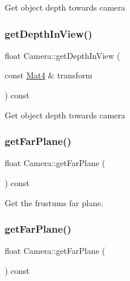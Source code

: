 Get object depth towards camera \mbox{\label{classCamera_a5b38e0d536fb4773aaad12285634b227}} 
\subsubsection{\texorpdfstring{get\+Depth\+In\+View()}{getDepthInView()}\hspace{0.1cm}{\footnotesize\ttfamily [2/2]}}
{\footnotesize\ttfamily float Camera\+::get\+Depth\+In\+View (\begin{DoxyParamCaption}\item[{const \hyperlink{classMat4}{Mat4} \&}]{transform }\end{DoxyParamCaption}) const}

Get object depth towards camera \mbox{\label{classCamera_ae3582b9b0a37d8d3351f6a1fc5a9b45c}} 
\subsubsection{\texorpdfstring{get\+Far\+Plane()}{getFarPlane()}\hspace{0.1cm}{\footnotesize\ttfamily [1/2]}}
{\footnotesize\ttfamily float Camera\+::get\+Far\+Plane (\begin{DoxyParamCaption}{ }\end{DoxyParamCaption}) const\hspace{0.3cm}{\ttfamily [inline]}}

Get the frustum\textquotesingle{}s far plane. \mbox{\label{classCamera_ae3582b9b0a37d8d3351f6a1fc5a9b45c}} 
\subsubsection{\texorpdfstring{get\+Far\+Plane()}{getFarPlane()}\hspace{0.1cm}{\footnotesize\ttfamily [2/2]}}
{\footnotesize\ttfamily float Camera\+::get\+Far\+Plane (\begin{DoxyParamCaption}{ }\end{DoxyParamCaption}) const\hspace{0.3cm}{\ttfamily [inline]}}

